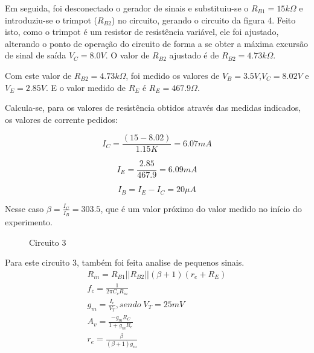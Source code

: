 \documentclass[a4paper]{article} %
\begin{document}
\newpage


Em seguida, foi desconectado o gerador de sinais e substituiu-se o $R_{B1}=15k\Omega$
e introduziu-se o trimpot ($R_{B2}$) no circuito, gerando o circuito da figura 4. Feito isto,
como o trimpot é um resistor de resistência variável, ele foi ajustado, alterando o
ponto de operação do circuito de forma a se obter a máxima excursão de sinal de saída
$V_C=8.0V$. O valor de $R_{B2}$ ajustado é de $R_{B2}=4.73k\Omega$.

Com este valor de $R_{B2}=4.73k\Omega$, foi medido os valores de
$V_B=3.5V$,$V_C=8.02V$ e $V_E=2.85V$. E o valor medido de $R_E$ é $R_E =467.9\Omega$.

Calcula-se, para os valores de resistência obtidos através das medidas indicados, os
valores de corrente pedidos:

\begin{displaymath}
I_C =\frac{(15-8.02)}{1.15K} = 6.07 mA
\end{displaymath}

\begin{displaymath}
I_E =\frac{2.85}{467.9} = 6.09 mA
\end{displaymath}

\begin{displaymath}
I_B = I_E - I_C = 20 \mu A
\end{displaymath}

Nesse caso $\beta = \frac{I_C}{I_B} = 303.5$, que é um valor próximo do valor medido no início do
experimento.


\vspace{3mm}
\begin{figure}[h!]
\centerline{}
\caption{Circuito 3\label{circ:3}}
\end{figure}


Para este circuito 3, também foi feita analise de pequenos sinais.
\begin{eqnarray}
R_{in}=R_{B1}||R_{B2}||(\beta+1)(r_{e}+R_E)\\
f_c=\frac{1}{2\pi C_cR_{in}}\\
g_m=\frac{I_c}{V_T},sendo \; V_T = 25 mV\\
A_v=\frac{-g_mR_C}{1+g_mR_e}\\
r_{e}=\frac{\beta}{(\beta+1)g_m}
\end{eqnarray}
\end{document}
